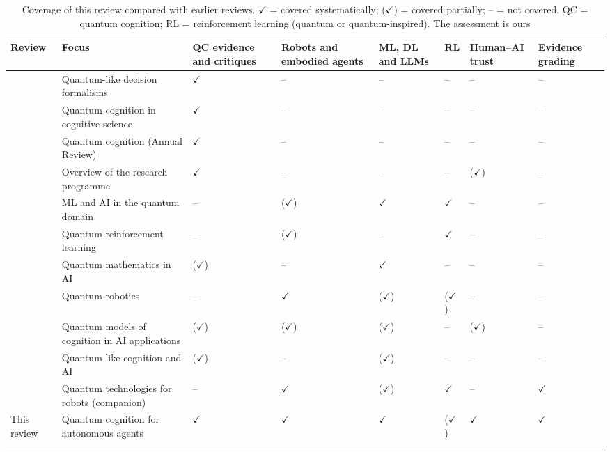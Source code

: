 \documentclass[pdflatex,sn-basic]{sn-jnl}
\begin{document}
\begin{table}[ht]
\caption{Coverage of this review compared with earlier reviews. $\checkmark$ = covered systematically; ($\checkmark$) = covered partially; -- = not covered. QC = quantum cognition; RL = reinforcement learning (quantum or quantum-inspired). The assessment is ours}\label{tab:surveys}%
\footnotesize
\begin{tabular}{@{}>{\raggedright\arraybackslash}p{0.170\dimexpr\textwidth-16\tabcolsep\relax}>{\raggedright\arraybackslash}p{0.230\dimexpr\textwidth-16\tabcolsep\relax}>{\raggedright\arraybackslash}p{0.100\dimexpr\textwidth-16\tabcolsep\relax}>{\raggedright\arraybackslash}p{0.100\dimexpr\textwidth-16\tabcolsep\relax}>{\raggedright\arraybackslash}p{0.100\dimexpr\textwidth-16\tabcolsep\relax}>{\raggedright\arraybackslash}p{0.100\dimexpr\textwidth-16\tabcolsep\relax}>{\raggedright\arraybackslash}p{0.100\dimexpr\textwidth-16\tabcolsep\relax}>{\raggedright\arraybackslash}p{0.100\dimexpr\textwidth-16\tabcolsep\relax}@{}}
\toprule
\textbf{Review} & \textbf{Focus} & \textbf{QC evidence and critiques} & \textbf{Robots and embodied agents} & \textbf{ML, DL and LLMs} & \textbf{RL} & \textbf{Human--AI trust} & \textbf{Evidence grading} \\ \midrule
\citet{Ashtiani2015} & Quantum-like decision formalisms & $\checkmark$ & -- & -- & -- & -- & -- \\
\citet{Bruza2015} & Quantum cognition in cognitive science & $\checkmark$ & -- & -- & -- & -- & -- \\
\citet{Pothos2022} & Quantum cognition (Annual Review) & $\checkmark$ & -- & -- & -- & -- & -- \\
\citet{Huang2025b} & Overview of the research programme & $\checkmark$ & -- & -- & -- & ($\checkmark$) & -- \\
\citet{Dunjko2018} & ML and AI in the quantum domain & -- & ($\checkmark$) & $\checkmark$ & $\checkmark$ & -- & -- \\
\citet{Meyer2022} & Quantum reinforcement learning & -- & ($\checkmark$) & -- & $\checkmark$ & -- & -- \\
\citet{Widdows2021} & Quantum mathematics in AI & ($\checkmark$) & -- & $\checkmark$ & -- & -- & -- \\
\citet{Yan2024} & Quantum robotics & -- & $\checkmark$ & ($\checkmark$) & ($\checkmark$) & -- & -- \\
\citet{Maksymov2026} & Quantum models of cognition in AI applications & ($\checkmark$) & ($\checkmark$) & ($\checkmark$) & -- & ($\checkmark$) & -- \\
\citet{Khrennikov2026} & Quantum-like cognition and AI & ($\checkmark$) & -- & ($\checkmark$) & -- & -- & -- \\
\citet{Guru2026} & Quantum technologies for robots (companion) & -- & $\checkmark$ & ($\checkmark$) & $\checkmark$ & -- & $\checkmark$ \\
This review & Quantum cognition for autonomous agents & $\checkmark$ & $\checkmark$ & $\checkmark$ & ($\checkmark$) & $\checkmark$ & $\checkmark$ \\
\botrule
\end{tabular}
\end{table}
\end{document}
